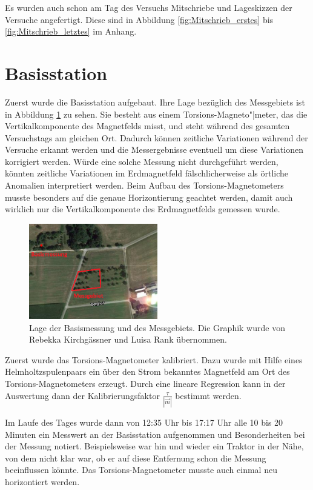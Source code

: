 Es wurden auch schon am Tag des Versuchs Mitschriebe und Lageskizzen der Versuche angefertigt. Diese sind in Abbildung \ref{fig:Mitschrieb_erstes} bis \ref{fig:Mitschrieb_letztes} im Anhang. 

\section{Basisstation}

Zuerst wurde die Basisstation aufgebaut. Ihre Lage bezüglich des Messgebiets ist in Abbildung \ref{fig:LageBasis} zu sehen. Sie besteht aus einem Torsions-Magneto"|meter, das die Vertikalkomponente des Magnetfelds misst, und steht während des gesamten Versuchstags am gleichen Ort. Dadurch können zeitliche Variationen während der Versuche erkannt werden und die Messergebnisse eventuell um diese Variationen korrigiert werden. Würde eine solche Messung nicht durchgeführt werden, könnten zeitliche Variationen im Erdmagnetfeld fälschlicherweise als örtliche Anomalien interpretiert werden. Beim Aufbau des Torsions-Magnetometers musste besonders auf die genaue Horizontierung geachtet werden, damit auch wirklich nur die Vertikalkomponente des Erdmagnetfelds gemessen wurde.

\begin{figure}[!ht]
 \centering
 \includegraphics[width=0.5\textwidth]{fig/Basismessunggps}
 \caption[Lage der Basismessung und des Messgebiets]{Lage der Basismessung und des Messgebiets. Die Graphik wurde von Rebekka Kirchgässner und Luisa Rank übernommen.}
 \label{fig:LageBasis}
\end{figure}

Zuerst wurde das Torsions-Magnetometer kalibriert. Dazu wurde mit Hilfe eines Helmholtzspulenpaars ein über den Strom bekanntes Magnetfeld am Ort des Torsions-Magnetometers erzeugt. Durch eine lineare Regression kann in der Auswertung dann der Kalibrierungsfaktor $\frac{\tau}{|\vec{m}|}$ bestimmt werden.

Im Laufe des Tages wurde dann von 12:35 Uhr bis 17:17 Uhr alle 10 bis 20 Minuten ein Messwert an der Basisstation aufgenommen und Besonderheiten bei der Messung notiert. Beispielsweise war hin und wieder ein Traktor in der Nähe, von dem nicht klar war, ob er auf diese Entfernung schon  die Messung beeinflussen könnte. Das Torsions-Magnetometer musste auch einmal neu horizontiert werden.

